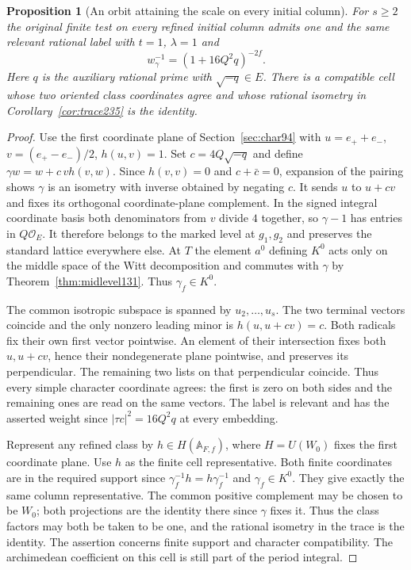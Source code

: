 \documentclass[a4paper,11pt]{article}
\newtheorem{proposition}{Proposition}[section]
\theoremstyle{definition}
\theoremstyle{remark}
\numberwithin{equation}{section}
\begin{document}
\begin{proposition}[An orbit attaining the scale on every initial column]
\leavevmode\label{prop:sharp237}
For \(s\ge2\) the original finite test on every refined
initial column admits one and the same relevant rational label
with \(t=1\), \(\lambda=1\) and
\[
                w_\gamma^{-1}=(1+16 Q^2 q)^{-2f}.
\]
Here \(q\) is the auxiliary rational prime with
\(\sqrt{-q}\in E\). There is a compatible cell whose two
oriented class coordinates agree and whose rational isometry
in Corollary~\ref{cor:trace235} is the identity.
\end{proposition}
\begin{proof}
Use the first coordinate plane of Section~\ref{sec:char94}
with \(u=e_++e_-\), \(v=(e_+-e_-)/2\), \(h(u,v)=1\).
Set \(c=4Q\sqrt{-q}\) and define
\(\gamma w=w+c\,v h(v,w)\).
Since \(h(v,v)=0\) and \(c+\bar c=0\), expansion of the
pairing shows \(\gamma\) is an isometry with inverse obtained
by negating \(c\). It sends \(u\) to \(u+cv\) and fixes its
orthogonal coordinate-plane complement. In the signed integral
coordinate basis both denominators from \(v\) divide \(4\)
together, so \(\gamma-1\) has entries in \(Q\mathcal O_E\).
It therefore belongs to the marked level at \(g_1,g_2\) and
preserves the standard lattice everywhere else. At \(T\) the
element \(a^0\) defining \(K^0\) acts only on the middle
space of the Witt decomposition and commutes with \(\gamma\)
by Theorem~\ref{thm:midlevel131}. Thus \(\gamma_f\in K^0\).

The common isotropic subspace is spanned by \(u_2,\ldots,u_s\).
The two terminal vectors coincide and the only nonzero leading
minor is \(h(u,u+cv)=c\). Both radicals fix their own first
vector pointwise. An element of their intersection fixes
both \(u,u+cv\), hence their nondegenerate plane pointwise,
and preserves its perpendicular. The remaining two lists on
that perpendicular coincide. Thus every simple character
coordinate agrees: the first is zero on both sides and the
remaining ones are read on the same vectors.
The label is relevant and has the asserted weight since
\(|\tau c|^2=16Q^2q\) at every embedding.

Represent any refined class by \(h\in H(\mathbb A_{F,f})\),
where \(H=U(W_0)\) fixes the first coordinate plane.
Use \(h\) as the finite cell representative. Both finite
coordinates are in the required support since
\(\gamma_f^{-1}h=h\gamma_f^{-1}\) and \(\gamma_f\in K^0\).
They give exactly the same column representative. The common
positive complement may be chosen to be \(W_0\); both
projections are the identity there since \(\gamma\) fixes it.
Thus the class factors may both be taken to be one, and the
rational isometry in the trace is the identity. The assertion
concerns finite support and character compatibility. The
archimedean coefficient on this cell is still part of the
period integral.
\end{proof}
\end{document}

